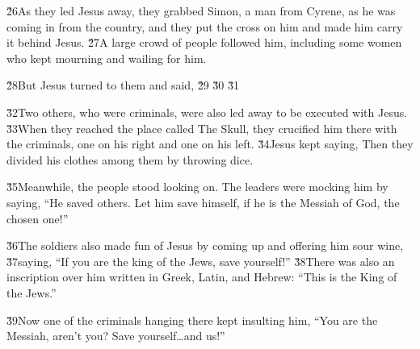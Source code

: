\v{26}As they led Jesus away, they grabbed Simon, a man from Cyrene, as he was coming in from the country, and they put the cross on him and made him carry it behind Jesus. \v{27}A large crowd of people followed him, including some women who kept mourning and wailing for him.

\v{28}But Jesus turned to them and said,   \v{29}  \v{30} \v{31}

\v{32}Two others, who were criminals, were also led away to be executed with Jesus. \v{33}When they reached the place called The Skull, they crucified him there with the criminals, one on his right and one on his left. \v{34}Jesus kept saying,  Then they divided his clothes among them by throwing dice.

\v{35}Meanwhile, the people stood looking on. The leaders were mocking him by saying, ``He saved others. Let him save himself, if he is the Messiah of God, the chosen one!''

\v{36}The soldiers also made fun of Jesus by coming up and offering him sour wine, \v{37}saying, ``If you are the king of the Jews, save yourself!'' \v{38}There was also an inscription over him written in Greek, Latin, and Hebrew: ``This is the King of the Jews.''

\v{39}Now one of the criminals hanging there kept insulting him, ``You are the Messiah, aren't you? Save yourself{\ldots}and us!''

